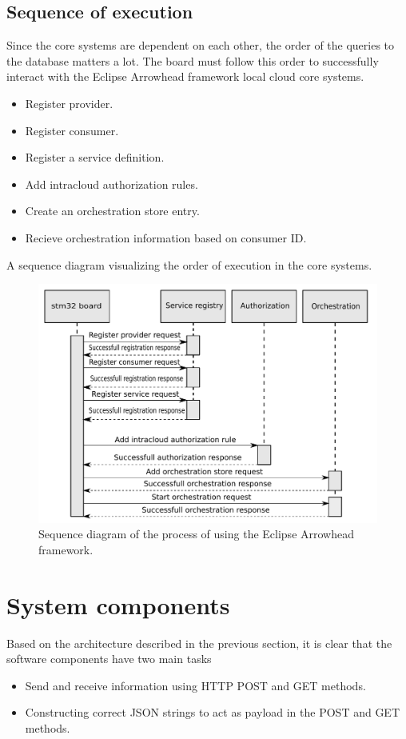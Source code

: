 \subsection{Sequence of execution}
Since the core systems are dependent on each other, the order of the queries to the database matters a lot.
The board must follow this order to successfully interact with the Eclipse Arrowhead framework local cloud core systems. 
\begin{itemize}
    \item Register provider.
    \item Register consumer.
    \item Register a service definition.
    \item Add intracloud authorization rules.
    \item Create an orchestration store entry.
    \item Recieve orchestration information based on consumer ID.
\end{itemize}
\newpage
A sequence diagram visualizing the order of execution in the core systems.
\begin{figure}[H]
    \centering
    \includegraphics[width=\textwidth]{Pictures/sequence_diagram_total.pdf} 
    \caption{Sequence diagram of the process of using the Eclipse Arrowhead framework.}
    \label{sequence diagram whole process}
\end{figure}

\section{System components}
Based on the architecture described in the previous section, it is clear that the software components have two main tasks
\begin{itemize}
    \item Send and receive information using HTTP POST and GET methods.
    \item Constructing correct JSON strings to act as payload in the POST and GET methods. 
\end{itemize}
